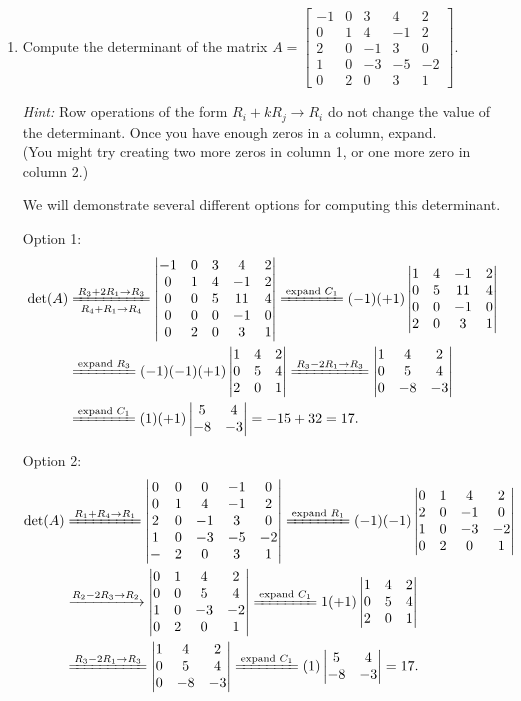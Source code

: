 \documentclass[12pt]{article}
\newcommand{\bbm}{\begin{bmatrix}}
\newcommand{\ebm}{\end{bmatrix}}
\newcommand{\bvm}{\begin{vmatrix}}
\newcommand{\evm}{\end{vmatrix}}
\begin{document}
\begin{enumerate}
\item Compute the determinant of the matrix $A=\bbm -1&0&3&4&2\\0&1&4&-1&2\\2&0&-1&3&0\\1&0&-3&-5&-2\\0&2&0&3&1\ebm$.

\textit{Hint:} Row operations of the form $R_i+kR_j\to R_i$ do not change the value of the determinant. Once you have enough zeros in a column, expand.\\ (You might try creating two more zeros in column 1, or one more zero in column 2.)
 
We will demonstrate several different options for computing this determinant.

Option 1:
\begin{align*}
\det(A) &\xlongequal[R_4+R_1\to R_4]{R_3+2R_1\to R_3} \bvm -1&0&3&4&2\\0&1&4&-1&2\\0&0&5&11&4\\0&0&0&-1&0\\0&2&0&3&1\evm \xlongequal{\text{expand }C_1}(-1)(+1)\bvm 1&4&-1&2\\0&5&11&4\\0&0&-1&0\\2&0&3&1\evm\\
&\xlongequal{\text{expand }R_3}(-1)(-1)(+1)\bvm 1&4&2\\0&5&4\\2&0&1\evm\xlongequal{R_3-2R_1\to R_3}\bvm 1&4&2\\0&5&4\\0&-8&-3\evm\\
&\xlongequal{\text{expand }C_1}(1)(+1)\bvm 5&4\\-8&-3\evm = -15+32=17.
\end{align*}

Option 2:
\begin{align*}
\det(A) &\xlongequal{R_1+R_4\to R_1}\bvm 0&0&0&-1&0\\0&1&4&-1&2\\2&0&-1&3&0\\1&0&-3&-5&-2\\-&2&0&3&1\evm\xlongequal{\text{expand }R_1}(-1)(-1)\bvm 0&1&4&2\\2&0&-1&0\\1&0&-3&-2\\0&2&0&1\evm\\
&\xrightarrow{R_2-2R_3\to R_2}\bvm 0&1&4&2\\0&0&5&4\\1&0&-3&-2\\0&2&0&1\evm \xlongequal{\text{expand }C_1}1(+1)\bvm 1&4&2\\0&5&4\\2&0&1\evm\\
&\xlongequal{R_3-2R_1\to R_3}\bvm 1&4&2\\0&5&4\\0&-8&-3\evm \xlongequal{\text{expand }C_1} (1)\bvm 5&4\\-8&-3\evm =17.
\end{align*}


\end{enumerate}
\end{document}
